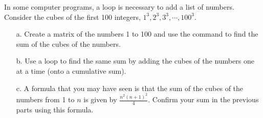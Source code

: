 {In some computer programs, a loop is necessary to add a list of numbers.  Consider the cubes of the first 100 integers, $1^3, 2^3, 3^3,\cdots ,100^3$.
\begin{enumerate}
\item[a.] Create a matrix of the numbers 1 to 100 and use the  command to find the sum of the cubes of the numbers.
\item[b.] Use a  loop to find the same sum by adding the cubes of the numbers one at a time (onto a cumulative sum).
\item[c.] A formula that you may have seen is that the sum of the cubes of the numbers from 1 to $n$ is given by 
$\displaystyle \frac{n^2 (n+1)^2}{4}$.  Confirm your sum in the previous parts using this formula.
\end{enumerate}}
{}




